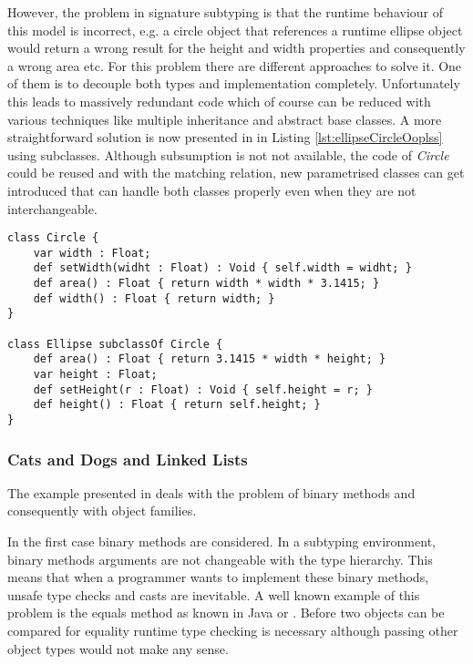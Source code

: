 However, the problem in signature subtyping is that the runtime behaviour
of this model is incorrect, e.g. a circle object that references a
runtime ellipse object would return a wrong result for the height and
width properties and consequently a wrong area etc. For this problem
there are different approaches to solve it. One of them is to
decouple both types and implementation completely. Unfortunately this
leads to massively redundant code which of course can be reduced with
various techniques like multiple inheritance and abstract base classes. A
more straightforward solution is now presented in \ooplss in Listing
\ref{lst:ellipseCircleOoplss} using subclasses. Although subsumption
is not not available, the code of \emph{Circle} could be reused and with the
matching relation, new parametrised classes can get introduced that can
handle both classes properly even when they are not interchangeable.

\begin{lstlisting}[float=ht,language=ooplss,caption=Circle-Ellipse problem in \ooplss,label=lst:ellipseCircleOoplss]
class Circle {
	var width : Float;
	def setWidth(widht : Float) : Void { self.width = widht; }
	def area() : Float { return width * width * 3.1415; }
	def width() : Float { return width; }
}

class Ellipse subclassOf Circle {
	def area() : Float { return 3.1415 * width * height; }
	var height : Float;
	def setHeight(r : Float) : Void { self.height = r; }
	def height() : Float { return self.height; }
}
\end{lstlisting}

\subsubsection{Cats and Dogs and Linked Lists}
The example presented in  deals with the
problem of binary methods and consequently with object families.

In the first case binary methods are considered. In a subtyping environment,
binary methods arguments are not changeable with the type hierarchy. This
means that when a programmer wants to implement these binary methods,
unsafe type checks and casts are inevitable. A well known example of this problem is the
equals method as known in Java or \cs. Before two objects can be compared
for equality runtime type checking is necessary although passing other
object types would not make any sense.

